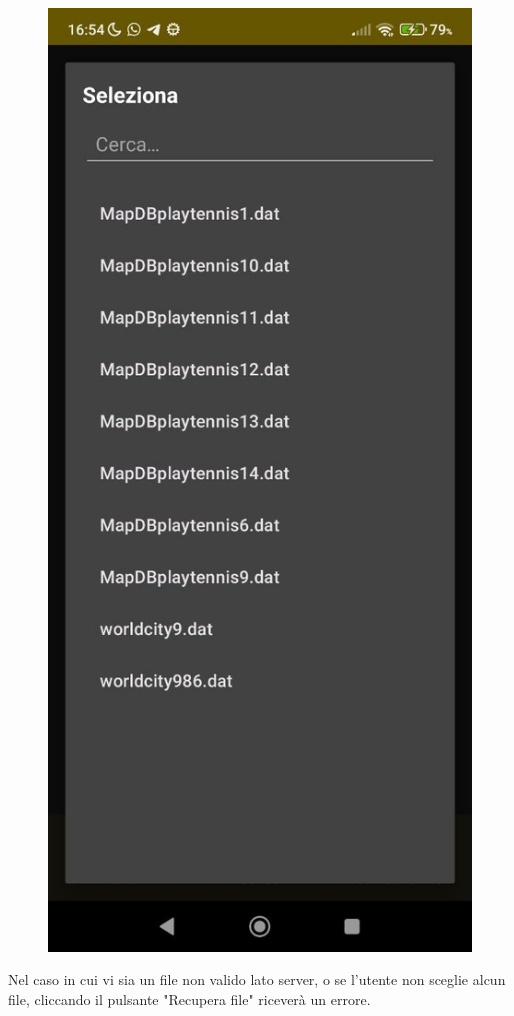\begin{enumerate}
  \begin{figure}[H]
    \centering
    \includegraphics[scale=0.2]{img/app8.png}
  \end{figure}
  Nel caso in cui vi sia un file non valido lato server, o se l'utente non sceglie alcun file, cliccando il pulsante "Recupera file" riceverà un errore. 

\end{enumerate}
